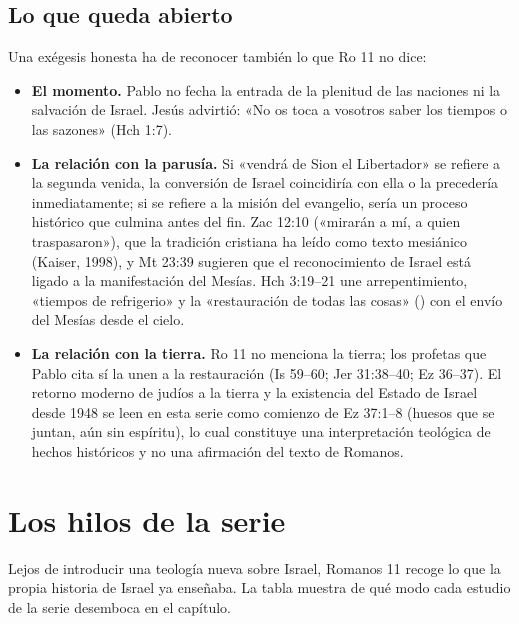 \subsection{Lo que queda abierto}
Una exégesis honesta ha de reconocer también lo que Ro 11 no dice:
\begin{itemize}
\item \textbf{El momento.} Pablo no fecha la entrada de la plenitud de las naciones ni la salvación de Israel. Jesús advirtió: «No os toca a vosotros saber los tiempos o las sazones» (Hch 1:7).
\item \textbf{La relación con la parusía.} Si «vendrá de Sion el Libertador» se refiere a la segunda venida, la conversión de Israel coincidiría con ella o la precedería inmediatamente; si se refiere a la misión del evangelio, sería un proceso histórico que culmina antes del fin. Zac 12:10 («mirarán a mí, a quien traspasaron»), que la tradición cristiana ha leído como texto mesiánico (Kaiser, 1998), y Mt 23:39 sugieren que el reconocimiento de Israel está ligado a la manifestación del Mesías. Hch 3:19--21 une arrepentimiento, «tiempos de refrigerio» y la «restauración de todas las cosas» () con el envío del Mesías desde el cielo.
\item \textbf{La relación con la tierra.} Ro 11 no menciona la tierra; los profetas que Pablo cita sí la unen a la restauración (Is 59--60; Jer 31:38--40; Ez 36--37). El retorno moderno de judíos a la tierra y la existencia del Estado de Israel desde 1948 se leen en esta serie como comienzo de Ez 37:1--8 (huesos que se juntan, aún sin espíritu), lo cual constituye una interpretación teológica de hechos históricos y no una afirmación del texto de Romanos.
\end{itemize}

\section{Los hilos de la serie}

Lejos de introducir una teología nueva sobre Israel, Romanos 11 recoge lo que la propia historia de Israel ya enseñaba. La tabla muestra de qué modo cada estudio de la serie desemboca en el capítulo.

